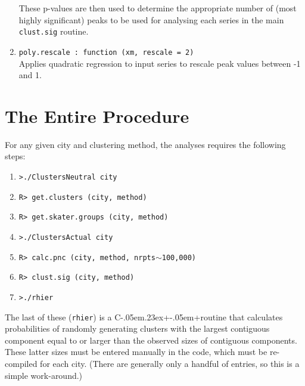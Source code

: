 \documentclass[a4paper,oneside]{article}
\def\CPP{{C\kern-.05em\raise.23ex\hbox{+\kern-.05em+}\hspace{4pt}}}
\begin{document}
\begin{enumerate}
        These p-values are then used to determine the appropriate number of (most highly significant) peaks to be used for analysing each series
        in the main {\tt clust.sig} routine.
    \item {\tt poly.rescale : function (xm, rescale = 2)}\\
        Applies quadratic regression to input series to rescale peak values between -1 and 1.
\end{enumerate}


\section{The Entire Procedure}

For any given city and clustering method, the analyses requires the following steps:
\begin{enumerate}
    \item {\tt >./ClustersNeutral city}
    \item {\tt R> get.clusters (city, method)}
    \item {\tt R> get.skater.groups (city, method)}
    \item {\tt >./ClustersActual city}
    \item {\tt R> calc.pnc (city, method, nrpts$\sim$100,000)}
    \item {\tt R> clust.sig (city, method)}
    \item {\tt >./rhier}
\end{enumerate}
The last of these ({\tt rhier}) is a \CPP routine that calculates probabilities of randomly generating clusters with the largest contiguous
component equal to or larger than the observed sizes of contiguous components. These latter sizes must be entered manually in the code, which
must be re-compiled for each city. (There are generally only a handful of entries, so this is a simple work-around.)
\end{document}
